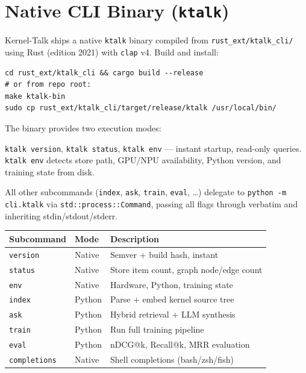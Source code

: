 \documentclass[11pt,a4paper]{article}
\newcommand{\coderef}[1]{\texttt{\small\color{layer2}#1}}
\begin{document}
\section{Native CLI Binary (\texttt{ktalk})}
\label{sec:rust-cli}

Kernel-Talk ships a native \texttt{ktalk} binary compiled from
\coderef{rust\_ext/ktalk\_cli/} using Rust (edition 2021) with \texttt{clap} v4.
Build and install:

\begin{lstlisting}[language={}]
cd rust_ext/ktalk_cli && cargo build --release
# or from repo root:
make ktalk-bin
sudo cp rust_ext/ktalk_cli/target/release/ktalk /usr/local/bin/
\end{lstlisting}

\noindent
The binary provides two execution modes:

\begin{description}[leftmargin=1.5em, itemsep=3pt]
  \item[\textbf{Native (no Python)}] \texttt{ktalk version}, \texttt{ktalk status},
        \texttt{ktalk env} --- instant startup, read-only queries.
        \texttt{ktalk env} detects store path, GPU/NPU availability, Python version,
        and training state from disk.

  \item[\textbf{Subprocess delegation}] All other subcommands
        (\texttt{index}, \texttt{ask}, \texttt{train}, \texttt{eval}, \ldots)
        delegate to \texttt{python -m cli.ktalk} via \texttt{std::process::Command},
        passing all flags through verbatim and inheriting stdin/stdout/stderr.
\end{description}

\begin{center}
\renewcommand{\arraystretch}{1.2}
\begin{tabular}{@{}lll@{}}
\toprule
\textbf{Subcommand} & \textbf{Mode} & \textbf{Description} \\
\midrule
\texttt{version}   & Native  & Semver + build hash, instant \\
\texttt{status}    & Native  & Store item count, graph node/edge count \\
\texttt{env}       & Native  & Hardware, Python, training state \\
\texttt{index}     & Python  & Parse + embed kernel source tree \\
\texttt{ask}       & Python  & Hybrid retrieval + LLM synthesis \\
\texttt{train}     & Python  & Run full training pipeline \\
\texttt{eval}      & Python  & nDCG@k, Recall@k, MRR evaluation \\
\texttt{completions} & Native & Shell completions (bash/zsh/fish) \\
\bottomrule
\end{tabular}
\end{center}
\end{document}
